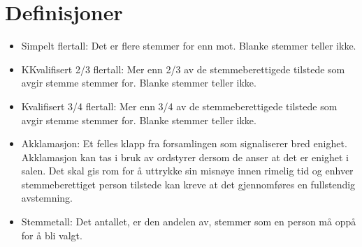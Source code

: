 \setcounter{chapter}{-1}
\chapter{Definisjoner}
\vspace{23pt}

\begin{itemize}
    \item Simpelt flertall: Det er flere stemmer for enn mot. Blanke stemmer teller ikke. 
    \item KKvalifisert 2/3 flertall: Mer enn 2/3 av de stemmeberettigede tilstede som avgir stemme stemmer for. Blanke stemmer teller ikke. 
    \item Kvalifisert 3/4 flertall: Mer enn 3/4 av de stemmeberettigede tilstede som avgir stemme stemmer for. Blanke stemmer teller ikke.
    \item Akklamasjon: Et felles klapp fra forsamlingen som signaliserer bred enighet. Akklamasjon kan tas i bruk av ordstyrer dersom de anser at det er enighet i salen. Det skal gis rom for å uttrykke sin misnøye innen rimelig tid og enhver stemmeberettiget person tilstede kan kreve at det gjennomføres en fullstendig avstemning.
    \item Stemmetall: Det antallet, er den andelen av, stemmer som en person må oppå for å bli valgt. 
  \end{itemize}

